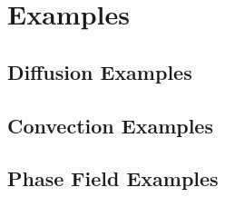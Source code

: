 \documentclass[letterpaper,twoside,openright,10pt]{memoir}
\begin{document}



% 
% 
% 



\sloppy

\part{Examples}
\label{part:Examples}



\renewcommand{\ptctitle}{Example Contents}
\parttoc

\chapter{Diffusion Examples}







\chapter{Convection Examples}


% 

% 
% 

\chapter{Phase Field Examples}
\end{document}
